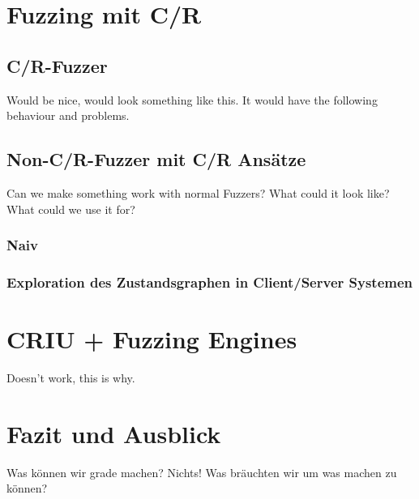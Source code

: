 \documentclass[12pt]{scrartcl}
\begin{document}
\section{Fuzzing mit C/R}
\subsection{C/R-Fuzzer}
Would be nice, would look something like this. It would have the following behaviour and problems.
\subsection{Non-C/R-Fuzzer mit C/R Ansätze}
Can we make something work with normal Fuzzers? What could it look like? What could we use it for?
\subsubsection{Naiv}
\subsubsection{Exploration des Zustandsgraphen in Client/Server Systemen}

\section{CRIU + Fuzzing Engines}
Doesn't work, this is why.

\section{Fazit und Ausblick}
Was können wir grade machen? Nichts! Was bräuchten wir um was machen zu können?
\end{document}
